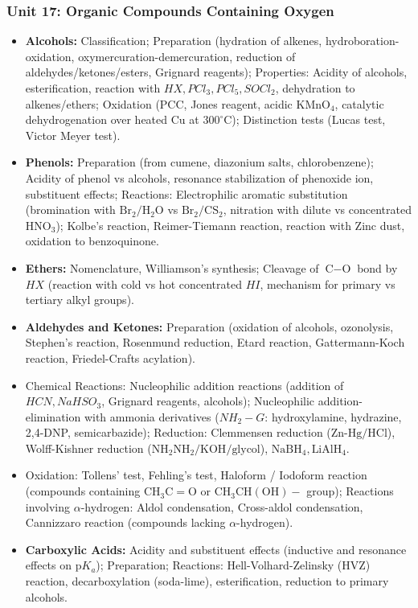 \documentclass[11pt,a4paper]{article}
\begin{document}
\subsubsection{Unit 17: Organic Compounds Containing Oxygen}
\begin{itemize}
  \item \textbf{Alcohols:} Classification; Preparation (hydration of alkenes, hydroboration-oxidation, oxymercuration-demercuration, reduction of aldehydes/ketones/esters, Grignard reagents); Properties: Acidity of alcohols, esterification, reaction with $HX, PCl_3, PCl_5, SOCl_2$, dehydration to alkenes/ethers; Oxidation (PCC, Jones reagent, acidic $\text{KMnO}_4$, catalytic dehydrogenation over heated Cu at $300^\circ\text{C}$); Distinction tests (Lucas test, Victor Meyer test).
  \item \textbf{Phenols:} Preparation (from cumene, diazonium salts, chlorobenzene); Acidity of phenol vs alcohols, resonance stabilization of phenoxide ion, substituent effects; Reactions: Electrophilic aromatic substitution (bromination with $\text{Br}_2/\text{H}_2\text{O}$ vs $\text{Br}_2/\text{CS}_2$, nitration with dilute vs concentrated $\text{HNO}_3$); Kolbe's reaction, Reimer-Tiemann reaction, reaction with Zinc dust, oxidation to benzoquinone.
  \item \textbf{Ethers:} Nomenclature, Williamson's synthesis; Cleavage of $\text{C}-\text{O}$ bond by $HX$ (reaction with cold vs hot concentrated $HI$, mechanism for primary vs tertiary alkyl groups).
  \item \textbf{Aldehydes and Ketones:} Preparation (oxidation of alcohols, ozonolysis, Stephen's reaction, Rosenmund reduction, Etard reaction, Gattermann-Koch reaction, Friedel-Crafts acylation).
  \item Chemical Reactions: Nucleophilic addition reactions (addition of $HCN, NaHSO_3$, Grignard reagents, alcohols); Nucleophilic addition-elimination with ammonia derivatives ($NH_2-G$: hydroxylamine, hydrazine, 2,4-DNP, semicarbazide); Reduction: Clemmensen reduction ($\text{Zn-Hg}/\text{HCl}$), Wolff-Kishner reduction ($\text{NH}_2\text{NH}_2/\text{KOH}/\text{glycol}$), $\text{NaBH}_4, \text{LiAlH}_4$.
  \item Oxidation: Tollens' test, Fehling's test, Haloform / Iodoform reaction (compounds containing $\text{CH}_3\text{C}=\text{O}$ or $\text{CH}_3\text{CH}(\text{OH})-$ group); Reactions involving $\alpha$-hydrogen: Aldol condensation, Cross-aldol condensation, Cannizzaro reaction (compounds lacking $\alpha$-hydrogen).
  \item \textbf{Carboxylic Acids:} Acidity and substituent effects (inductive and resonance effects on $\text{p}K_a$); Preparation; Reactions: Hell-Volhard-Zelinsky (HVZ) reaction, decarboxylation (soda-lime), esterification, reduction to primary alcohols.
\end{itemize}
\end{document}
